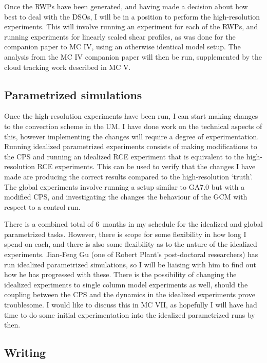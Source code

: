 \documentclass[11pt,a4paper]{article}
\begin{document}
Once the RWPs have been generated, and having made a decision about how best to deal with the DSOs, I will be in a position to perform the high-resolution experiments. This will involve running an experiment for each of the RWPs, and running experiments for linearly scaled shear profiles, as was done for the companion paper to MC IV, using an otherwise identical model setup. The analysis from the MC IV companion paper will then be run, supplemented by the cloud tracking work described in MC V.

\subsection{Parametrized simulations}
\label{sec:Parametrized simulations}

Once the high-resolution experiments have been run, I can start making changes to the convection scheme in the UM. I have done work on the technical aspects of this, however implementing the changes will require a degree of experimentation. Running idealized parametrized experiments consists of making modifications to the CPS and running an idealized RCE experiment that is equivalent to the high-resolution RCE experiments. This can be used to verify that the changes I have made are producing the correct results compared to the high-resolution `truth'. The global experiments involve running a setup similar to GA7.0 but with a modified CPS, and investigating the changes the behaviour of the GCM with respect to a control run.

There is a combined total of \SI{6}{months} in my schedule for the idealized and global parametrized tasks.  However, there is scope for some flexibility in how long I spend on each, and there is also some flexibility as to the nature of the idealized experiments. Jian-Feng Gu (one of Robert Plant's post-doctoral researchers) has run idealized parametrized simulations, so I will be liaising with him to find out how he has progressed with these. There is the possibility of changing the idealized experiments to single column model experiments as well, should the coupling between the CPS and the dynamics in the idealized experiments prove troublesome. I would like to discuss this in MC VII, as hopefully I will have had time to do some initial experimentation into the idealized parametrized runs by then.

\subsection{Writing}
\label{sec:Writing}
\end{document}
